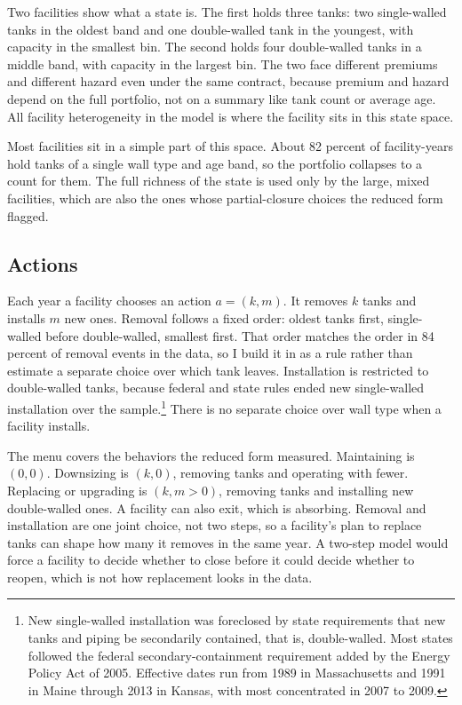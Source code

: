 \documentclass[
  12pt,
]{article}
\begin{document}
Two facilities show what a state is. The first holds three tanks: two
single-walled tanks in the oldest band and one double-walled tank in the
youngest, with capacity in the smallest bin. The second holds four
double-walled tanks in a middle band, with capacity in the largest bin.
The two face different premiums and different hazard even under the same
contract, because premium and hazard depend on the full portfolio, not
on a summary like tank count or average age. All facility heterogeneity
in the model is where the facility sits in this state space.

Most facilities sit in a simple part of this space. About 82 percent of
facility-years hold tanks of a single wall type and age band, so the
portfolio collapses to a count for them. The full richness of the state
is used only by the large, mixed facilities, which are also the ones
whose partial-closure choices the reduced form flagged.

\subsection{Actions}\label{actions}

Each year a facility chooses an action \(a = (k, m)\). It removes \(k\)
tanks and installs \(m\) new ones. Removal follows a fixed order: oldest
tanks first, single-walled before double-walled, smallest first. That
order matches the order in 84 percent of removal events in the data, so
I build it in as a rule rather than estimate a separate choice over
which tank leaves. Installation is restricted to double-walled tanks,
because federal and state rules ended new single-walled installation
over the sample.\footnote{New single-walled installation was foreclosed
  by state requirements that new tanks and piping be secondarily
  contained, that is, double-walled. Most states followed the federal
  secondary-containment requirement added by the Energy Policy Act of
  2005. Effective dates run from 1989 in Massachusetts and 1991 in Maine
  through 2013 in Kansas, with most concentrated in 2007 to 2009.} There
is no separate choice over wall type when a facility installs.

The menu covers the behaviors the reduced form measured. Maintaining is
\((0,0)\). Downsizing is \((k,0)\), removing tanks and operating with
fewer. Replacing or upgrading is \((k, m>0)\), removing tanks and
installing new double-walled ones. A facility can also exit, which is
absorbing. Removal and installation are one joint choice, not two steps,
so a facility's plan to replace tanks can shape how many it removes in
the same year. A two-step model would force a facility to decide whether
to close before it could decide whether to reopen, which is not how
replacement looks in the data.
\end{document}

